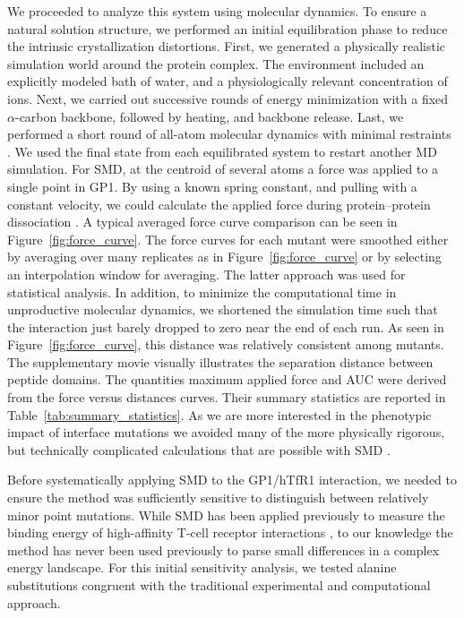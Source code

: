 \documentclass[12pt]{article} %
\providecommand{\DIFaddbegin}{} %
\providecommand{\DIFaddend}{} %
\providecommand{\DIFdelbegin}{} %
\providecommand{\DIFdelend}{} %
\begin{document}
We proceeded to analyze this system using molecular dynamics. To ensure a natural solution structure, we performed an initial equilibration phase to reduce the intrinsic crystallization distortions. First, we generated a physically realistic simulation world around the protein complex. The environment included an explicitly modeled bath of water, and a physiologically relevant concentration of ions. Next, we carried out successive rounds of energy minimization with a fixed $\alpha$-carbon backbone, followed by heating, and backbone release. Last, we performed a short round of all-atom molecular dynamics with minimal restraints \DIFdelbegin %
\DIFdelend \DIFaddbegin \citep{Cuendet2008}\DIFaddend . We used the final state from each equilibrated system to restart another MD simulation. For SMD, at the centroid of several atoms a force was applied to a single point in GP1. By using a known spring constant, and pulling with a constant velocity, we could calculate the applied force during protein--protein dissociation \DIFdelbegin %
\DIFdelend \DIFaddbegin \citep{Cuendet2008,Cuendet2011}\DIFaddend . A typical averaged force curve comparison can be seen in Figure~\ref{fig:force_curve}. The force curves for each mutant were smoothed either by averaging over many replicates as in Figure~\ref{fig:force_curve} or by selecting an interpolation window for averaging. The latter approach was used for statistical analysis. In addition, to minimize the computational time in unproductive molecular dynamics, we shortened the simulation time such that the interaction just barely dropped to zero near the end of each run. As seen in Figure~\ref{fig:force_curve}, this distance was relatively consistent among mutants. The supplementary movie visually illustrates the separation distance between peptide domains. The quantities maximum applied force and AUC were derived from the force versus distances curves. Their summary statistics are reported in Table~\ref{tab:summary_statistics}. As we are more interested in the phenotypic impact of interface mutations we avoided many of the more physically rigorous, but technically complicated calculations that are possible with SMD \DIFdelbegin %
\DIFdelend \DIFaddbegin \citep{Is2001A,Is2001B}\DIFaddend .

Before systematically applying SMD to the GP1/hTfR1 interaction, we needed to ensure the method was sufficiently sensitive to distinguish between relatively minor point mutations. While SMD has been applied previously to measure the binding energy of high-affinity T-cell receptor interactions \DIFdelbegin %
\DIFdelend \DIFaddbegin \citep{Cuendet2008,Cuendet2011}\DIFaddend , to our knowledge the method has never been used previously to parse small differences in a complex energy landscape. For this initial sensitivity analysis, we tested alanine substitutions congruent with the traditional experimental and computational approach. 
\end{document}
